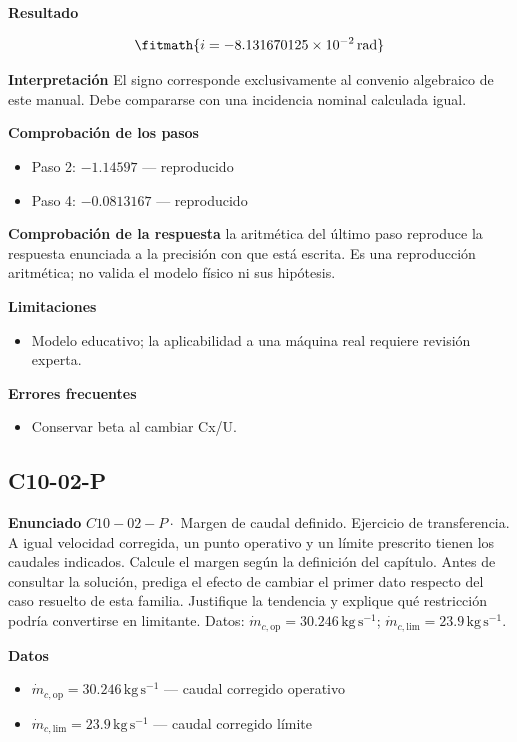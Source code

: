 \documentclass[10pt,openany]{book}
\begin{document}
\noindent\textbf{Resultado}

\[
\fitmath{i=-8.131670125\times10^{-2}\,\mathrm{rad}}
\]

\noindent\textbf{Interpretación}
El signo corresponde exclusivamente al convenio algebraico de este manual. Debe compararse con una incidencia nominal calculada igual.

\noindent\textbf{Comprobación de los pasos}
\begin{itemize}
\item Paso 2: $-1.14597$ — reproducido
\item Paso 4: $-0.0813167$ — reproducido
\end{itemize}

\noindent\textbf{Comprobación de la respuesta} la aritmética del último paso reproduce la respuesta enunciada a la precisión con que está escrita. Es una reproducción aritmética; no valida el modelo físico ni sus hipótesis.

\noindent\textbf{Limitaciones}
\begin{itemize}
\item Modelo educativo; la aplicabilidad a una máquina real requiere revisión experta.
\end{itemize}

\noindent\textbf{Errores frecuentes}
\begin{itemize}
\item Conservar beta al cambiar Cx/U.
\end{itemize}
\subsection*{C10-02-P}

\noindent\textbf{Enunciado}
\(C10-02-P \cdot\) Margen de caudal definido. Ejercicio de transferencia. A igual velocidad corregida, un punto operativo y un límite prescrito tienen los caudales indicados. Calcule el margen según la definición del capítulo. Antes de consultar la solución, prediga el efecto de cambiar el primer dato respecto del caso resuelto de esta familia. Justifique la tendencia y explique qué restricción podría convertirse en limitante. Datos: \(\dot{m}_{c,\mathrm{op}}=30.246\, \mathrm{kg}\,\mathrm{s}^{-1}\); \(\dot{m}_{c,\mathrm{lim}}=23.9\, \mathrm{kg}\,\mathrm{s}^{-1}\).

\noindent\textbf{Datos}
\begin{itemize}
\item $\dot{m}_{c,\mathrm{op}} = 30.246\,\mathrm{kg}\,\mathrm{s}^{-1}$ — caudal corregido operativo
\item $\dot{m}_{c,\mathrm{lim}} = 23.9\,\mathrm{kg}\,\mathrm{s}^{-1}$ — caudal corregido límite
\end{itemize}
\end{document}
